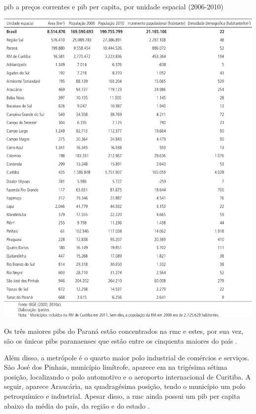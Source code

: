 	\begin{table}
		\centering
		\caption{\gls{pib} a preços correntes e \gls{pib} per capita, por unidade espacial (2006-2010)}
		\includegraphics[width=1.0\linewidth]{img/costa2015a_10}
		\label{tab:costa2015a_10}
	\end{table}

	Os três maiores \gls{pib}s do Paraná estão concentrados na \glsdesc{rmc} e estes, por sua vez, são os únicos \gls{pib}s paranaenses que estão entre os cinquenta maiores do país \cite[p. 11]{costa2015a}.

	Além disso,  a metrópole é o quarto maior polo industrial de comércios e serviços. São José dos Pinhais, município limítrofe, aparece em na trigésima sétima posição, localizando o polo automotivo e o aeroporto internacional de Curitiba. A seguir, aparece Araucária, na quadragésima posição, tendo o município um polo petroquímico e industrial. Apesar disso, a \gls{rmc} ainda possui um \gls{pib} per capita abaixo da média do país, da região e do estado \cite[p. 11]{costa2015a}.
	

